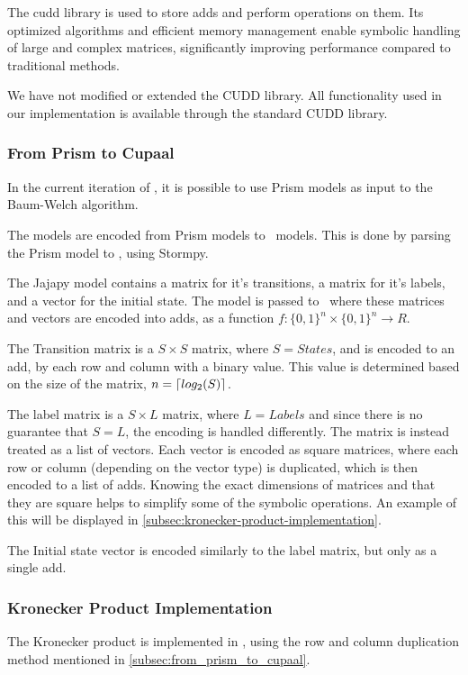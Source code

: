 The \gls{cudd} library is used to store \glspl{add} and perform operations on them.
Its optimized algorithms and efficient memory management enable symbolic handling of large and complex matrices, significantly improving performance compared to traditional methods.

We have not modified or extended the CUDD library.
All functionality used in our implementation is available through the standard CUDD library.

\subsubsection{From Prism to Cupaal}\label{subsec:from_prism_to_cupaal}
In the current iteration of \Cupaal, it is possible to use Prism models as input to the Baum-Welch algorithm.

The models are encoded from Prism models to \Cupaal\ models. This is done by parsing the Prism model to \Jajapy, using Stormpy.

The Jajapy model contains a matrix for it's transitions, a matrix for it's labels, and a vector for the initial state.
The model is passed to \Cupaal\ where these matrices and vectors are encoded into \glspl{add}, as a function $f \colon \{0,1\}^n \times \{0,1\}^n \to R$.

The Transition matrix is a $S\times S$ matrix, where $S=States$, and is encoded to an \gls{add}, by each row and column with a binary value. This value is determined based on the size of the matrix,
$n = \left\lceil log_2(S) \right\rceil$.

The label matrix is a $S\times L$ matrix, where $L=Labels$ and since there is no guarantee that $S = L$, the encoding is handled differently.
The matrix is instead treated as a list of vectors.
Each vector is encoded as square matrices, where each row or column (depending on the vector type) is duplicated, which is then encoded to a list of \glspl{add}.
Knowing the exact dimensions of matrices and that they are square helps to simplify some of the symbolic operations.
An example of this will be displayed in \autoref{subsec:kronecker-product-implementation}.

The Initial state vector is encoded similarly to the label matrix, but only as a single \gls{add}.

\subsubsection{Kronecker Product Implementation}\label{subsec:kronecker-product-implementation}
The Kronecker product is implemented in \Cupaal, using the row and column duplication method mentioned in \autoref{subsec:from_prism_to_cupaal}.

